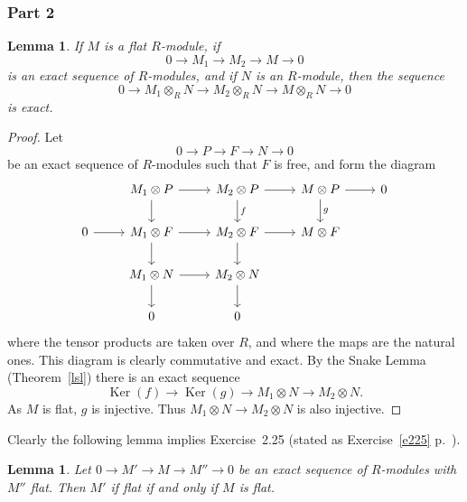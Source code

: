 \documentclass[parskip=half,fontsize=12pt]{scrartcl}%
\newcommand{\oo}{\operatorname}\newcommand{\ooo}{\operatorname*}
\newtheorem{lem}[thm]{Lemma}
\begin{document}

\subsubsection{Part 2}

\begin{lem}\label{b254}
If $M$ is a flat $R$-module, if 
$$
0\to M_1\to M_2\to M\to0
$$ 
is an exact sequence of $R$-modules, and if $N$ is an $R$-module, then the sequence 
$$
0\to M_1\otimes_RN\to M_2\otimes_RN\to M\otimes_RN\to0
$$ 
is exact.
\end{lem}

\begin{proof}
Let 
$$
0\to P\to F\to N\to 0
$$ 
be an exact sequence of $R$-modules such that $F$ is free, and form the diagram
$$
\begin{tikzcd}
&M_1\otimes P\ar[d]\ar[r]&M_2\otimes P\ar[d,"f"]\ar[r]&M\otimes P\ar[d,"g"]\ar[r]&0\\ 
0\ar[r]&M_1\otimes F\ar[d]\ar[r]&M_2\otimes F\ar[d]\ar[r]&M\otimes F\\ 
&M_1\otimes N\ar[d]\ar[r]&M_2\otimes N\ar[d]\\ 
&0&0
\end{tikzcd}
$$ 
where the tensor products are taken over $R$, and where the maps are the natural ones. This diagram is clearly commutative and exact. By the Snake Lemma (Theorem~\ref{lsl}) there is an exact sequence  
$$
\oo{Ker}(f)\to\oo{Ker}(g)\to M_1\otimes N\to M_2\otimes N.
$$ 
As $M$ is flat, $g$ is injective. Thus $M_1\otimes N\to M_2\otimes N$ is also injective. 
\end{proof}

Clearly the following lemma implies Exercise~2.25 (stated as Exercise~\ref{e225} p.~\pageref{e225}).

\begin{lem}
Let $0\to M'\to M\to M''\to0$ be an exact sequence of $R$-modules with $M''$ flat. Then $M'$ if flat if and only if $M$ is flat.
\end{lem}
\end{document}
